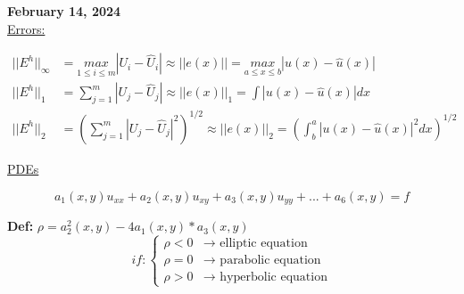 \documentclass[10pt]{article}
\newcommand{\1}{\mathbb{1}}
\begin{document}
\textbf{February 14, 2024}\\

\underline{Errors:}

\begin{align*}
    ||E^h||_{\infty} &= \underset{1 \leq i \leq m}{max} |U_i - \hat{U}_i| \approx ||e(x)|| = \underset{a \leq x \leq b}{max} |u(x) - \hat{u}(x)|\\
    ||E^h||_1 &= \sum_{j=1}^m |U_j - \hat{U}_j| \approx ||e(x)||_1 = \int | u(x) - \hat{u}(x)| dx\\
    ||E^h||_2 &= (\sum_{j=1}^m |U_j - \hat{U}_j|^2)^{1/2} \approx ||e(x)||_2 = (\int_b^a |u(x) - \hat{u}(x)|^2 dx)^{1/2}
\end{align*}

\underline{PDEs}

\[a_1(x,y) u_{xx} + a_2(x,y)u_{xy} + a_3(x,y)u_{yy} + ... + a_6 (x,y) = f\]

\textbf{Def:} $\rho = a_2^2(x,y) - 4a_1(x,y) * a_3(x,y)$\\
\[if: \begin{cases}
    \rho < 0 &\to \text{ elliptic equation}\\
    \rho = 0 &\to \text{ parabolic equation}\\
    \rho > 0 &\to \text{ hyperbolic equation}
\end{cases}\]
\end{document}
